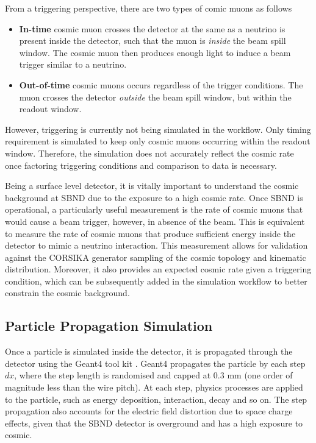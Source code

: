 From a triggering perspective, there are two types of comic muons as follows 
\begin{itemize}
	\item\textbf{In-time} cosmic muon crosses the detector at the same as a neutrino is present inside the detector, such that the muon is \textit{inside} the beam spill window. The cosmic muon then produces enough light to induce a beam trigger similar to a neutrino.
	\item\textbf{Out-of-time} cosmic muons occurs regardless of the trigger conditions. The muon crosses the detector \textit{outside} the beam spill window, but within the readout window.
\end{itemize}
However, triggering is currently not being simulated in the workflow. 
Only timing requirement is simulated to keep only cosmic muons occurring within the readout window.
Therefore, the simulation does not accurately reflect the cosmic rate once factoring triggering conditions and comparison to data is necessary. 

Being a surface level detector, it is vitally important to understand the cosmic background at SBND due to the exposure to a high cosmic rate.
Once SBND is operational, a particularly useful measurement is the rate of cosmic muons that would cause a beam trigger, however, in absence of the beam.
This is equivalent to measure the rate of cosmic muons that produce sufficient energy inside the detector to mimic a neutrino interaction.
This measurement allows for validation against the CORSIKA generator sampling of the cosmic topology and kinematic distribution. 
Moreover, it also provides an expected cosmic rate given a triggering condition, which can be subsequently added in the simulation workflow to better constrain the cosmic background.

\subsection{Particle Propagation Simulation}
\label{sec:gen_g4}

Once a particle is simulated inside the detector, it is propagated through the detector using the Geant4 tool kit \cite{geant4}.
Geant4 propagates the particle by each step $dx$, where the step length is randomised and capped at 0.3 mm (one order of magnitude less than the wire pitch).
At each step, physics processes are applied to the particle, such as energy deposition, interaction, decay and so on.
The step propagation also accounts for the electric field distortion due to space charge effects, given that the SBND detector is overground and has a high exposure to cosmic.

